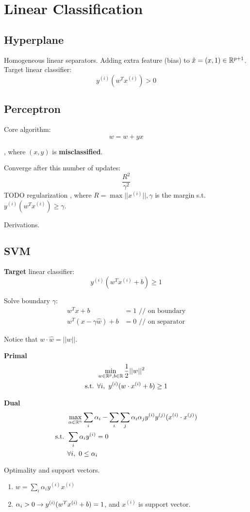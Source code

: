 \documentclass[a4paper]{report}
\begin{document}
\chapter{Linear Classification}
\section{Hyperplane} 
Homogeneous linear separators. Adding extra feature (bias) to $\tilde x=(x,1)\in \mathbb{R}^{p+1}$. 
Target linear classifier:
$$
y^{(i)}(w^T x^{(i)}) > 0
$$
\section{Perceptron}
Core algorithm:
$$
w = w+yx
$$

, where $(x, y)$ is \textbf{misclassified}. 

Converge after this number of updates: 
$$
\frac{R^2}{\gamma^2}
$$
TODO regularization 
, where $R=\max ||x^{(i)}||, \gamma $ is the margin s.t. $y^{(i)}(w^T x^{(i)}) \geq \gamma$. 

Derivations. 

\section{SVM}
\textbf{Target} linear classifier:
$$
y^{(i)} (w^T x^{(i)}+b) \geq 1 
$$

Solve boundary $\gamma$:
\begin{align*}
w^T x + b &=1 \text{ // on boundary}\\
w^T(x-\gamma \hat w)+b &= 0 \text{ // on separator}
\end{align*}

Notice that $w \cdot \hat w=||w||$.

\textbf{Primal}
\begin{align*}
& \min_{w\in \mathbb{R}^p, b\in \mathbb{R}} \frac{1}{2}||w||^2\\ 
\text{s.t. } & \forall i,~ y^{(i)}(w \cdot x^{(i)}+b)\geq 1 
\end{align*}

\textbf{Dual}
\begin{align*}
& \max_{\alpha \in \mathbb{R}^n} \sum_i \alpha_i -\sum_i\sum_j \alpha_i \alpha_j y^{(i)}y^{(j)}(x^{(i)}\cdot x^{(j)}) \\
\text{s.t. } & \sum_i \alpha_i y^{(i)} = 0\\
& \forall i,~ 0\leq\alpha_i 
\end{align*}

Optimality and support vectors. 
\begin{enumerate}
\item $w=\sum_i \alpha_i y^{(i)} x^{(i)}$ 
\item $\alpha_i >0 \rightarrow y^{(i)}(w^T x^{(i)}+b)=1$, and $x^{(i)}$ is support vector.
\end{enumerate}
\end{document}
